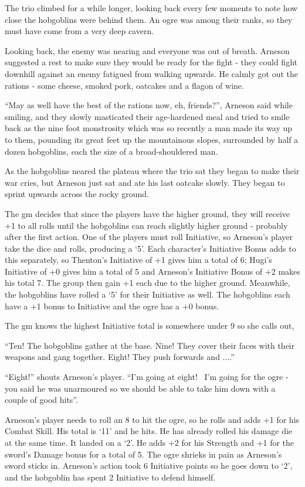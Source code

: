 \begin{multicols}{2}
{\begin{exampletext}
	The trio climbed for a while longer, looking back every few moments to note how close the hobgoblins were behind them. An ogre was among their ranks, so they must have come from a very deep cavern.

	Looking back, the enemy was nearing and everyone was out of breath.
	Arneson suggested a rest to make sure they would be ready for the fight - they could fight downhill against an enemy fatigued from walking upwards.
	He calmly got out the rations - some cheese, smoked pork, oatcakes and a flagon of wine.

	``May as well have the best of the rations now, eh, friends?'', Arneson said while smiling, and they slowly masticated their age-hardened meal and tried to smile back as the nine foot monstrosity which was so recently a man made its way up to them, pounding its great feet up the mountainous slopes, surrounded by half a dozen hobgoblins, each the size of a broad-shouldered man.

	As the hobgoblins neared the plateau where the trio sat they began to make their war cries, but Arneson just sat and ate his last oatcake slowly. They began to sprint upwards across the rocky ground.

	The \gls{gm} decides that since the players have the higher ground, they will receive +1 to all rolls until the hobgoblins can reach slightly higher ground - probably after the first action.
One of the players must roll Initiative, so Arneson's player take the dice and rolls, producing a `5'.
Each character's Initiative Bonus adds to this separately, so Thenton's Initiative of +1 gives him a total of 6; Hugi's Initiative of +0 gives him a total of 5 and Arneson's Initiative Bonus of +2 makes his total 7.
The group then gain +1 each due to the higher ground.
Meanwhile, the hobgoblins have rolled a `5' for their Initiative as well.
The hobgoblins each have a +1 bonus to Initiative and the ogre has a +0 bonus.

	The \gls{gm} knows the highest Initiative total is somewhere under 9 so she calls out,

	``Ten! The hobgoblins gather at the base. Nine! They cover their faces with their weapons and gang together. Eight! They push forwards and ....''

	``Eight!'' shouts Arneson's player. ``I'm going at eight! \ I'm going for the ogre - you said he was unarmoured so we should be able to take him down with a couple of good hits''.


	Arneson's player needs to roll an 8 to hit the ogre, so he rolls and adds +1 for his Combat Skill. His total is `11' and he hits. He has already rolled his damage die at the same time. It landed on a `2'. He adds +2 for his Strength and +1 for the sword's Damage bonus for a total of 5. The ogre shrieks in pain as Arneson's sword sticks in. Arneson's action took 6 Initiative points so he goes down to `2', and the hobgoblin has spent 2 Initiative to defend himself.


\end{exampletext}}
\end{multicols}
